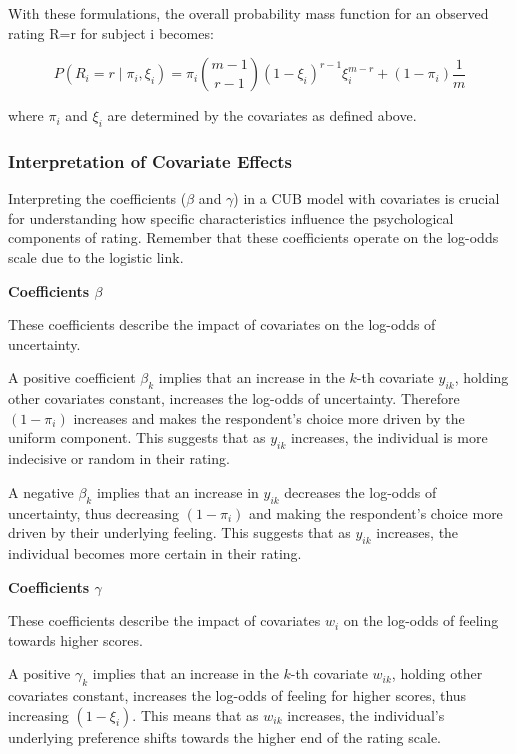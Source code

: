 \documentclass[
  letterpaper,
  DIV=11,
  numbers=noendperiod]{scrartcl}
\begin{document}
With these formulations, the overall probability mass function for an
observed rating R=r for subject i becomes:

\[
P(R_i = r \mid \pi_i,\xi_i) = \pi_i \binom{m-1}{r-1}(1-\xi_i)^{r-1}\xi_i^{m-r} + (1-\pi_i) \frac{1}{m}
\]

where \(\pi_i\) and \(\xi_i\) are determined by the covariates as
defined above.

\hypertarget{interpretation-of-covariate-effects}{%
\subsubsection{Interpretation of Covariate
Effects}\label{interpretation-of-covariate-effects}}

Interpreting the coefficients (\(\beta\) and \(\gamma\)) in a CUB model
with covariates is crucial for understanding how specific
characteristics influence the psychological components of rating.
Remember that these coefficients operate on the log-odds scale due to
the logistic link.

\textbf{Coefficients \(\beta\)}

These coefficients describe the impact of covariates on the log-odds of
uncertainty.

A positive coefficient \(\beta_k\) implies that an increase in the
\(k\)-th covariate \(y_{ik}\), holding other covariates constant,
increases the log-odds of uncertainty. Therefore \((1−\pi_i)\) increases
and makes the respondent's choice more driven by the uniform component.
This suggests that as \(y_{ik}\) increases, the individual is more
indecisive or random in their rating.

A negative \(\beta_k\) implies that an increase in \(y_{ik}\) decreases
the log-odds of uncertainty, thus decreasing \((1−\pi_i)\) and making
the respondent's choice more driven by their underlying feeling. This
suggests that as \(y_{ik}\) increases, the individual becomes more
certain in their rating.

\textbf{Coefficients \(\gamma\)}

These coefficients describe the impact of covariates \(w_i\) on the
log-odds of feeling towards higher scores.

A positive \(\gamma_k\) implies that an increase in the \(k\)-th
covariate \(w_{ik}\), holding other covariates constant, increases the
log-odds of feeling for higher scores, thus increasing \((1-\xi_i)\).
This means that as \(w_{ik}\) increases, the individual's underlying
preference shifts towards the higher end of the rating scale.
\end{document}
